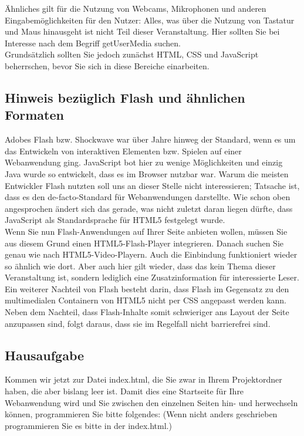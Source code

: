 Ähnliches gilt für die Nutzung von Webcams, Mikrophonen und anderen Eingabemöglichkeiten für den Nutzer: Alles, was über die Nutzung von Tastatur und Maus hinausgeht ist nicht Teil dieser Veranstaltung. Hier sollten Sie bei Interesse nach dem Begriff getUserMedia suchen.\\

Grundsätzlich sollten Sie jedoch zunächst HTML, CSS und JavaScript beherrschen, bevor Sie sich in diese Bereiche einarbeiten.

\subsection{Hinweis bezüglich Flash und ähnlichen Formaten}

Adobes Flash bzw. Shockwave war über Jahre hinweg der Standard, wenn es um das Entwickeln von interaktiven Elementen bzw. Spielen auf einer Webanwendung ging. JavaScript bot hier zu wenige Möglichkeiten und einzig Java wurde so entwickelt, dass es im Browser nutzbar war. Warum die meisten Entwickler Flash nutzten soll uns an dieser Stelle nicht interessieren; Tatsache ist, dass es den de-facto-Standard für Webanwendungen darstellte. Wie schon oben angesprochen ändert sich das gerade, was nicht zuletzt daran liegen dürfte, dass JavaScript als Standardsprache für HTML5 festgelegt wurde. \\

Wenn Sie nun Flash-Anwendungen auf Ihrer Seite anbieten wollen, müssen Sie aus diesem Grund einen HTML5-Flash-Player integrieren. Danach suchen Sie genau wie nach HTML5-Video-Playern. Auch die Einbindung funktioniert wieder so ähnlich wie dort. Aber auch hier gilt wieder, dass das kein Thema dieser Veranstaltung ist, sondern lediglich eine Zusatzinformation für interessierte Leser.\\

Ein weiterer Nachteil von Flash besteht darin, dass Flash im Gegensatz zu den multimedialen Containern von HTML5 nicht per CSS angepasst werden kann. Neben dem Nachteil, dass Flash-Inhalte somit schwieriger ans Layout der Seite anzupassen sind, folgt daraus, dass sie im Regelfall nicht barrierefrei sind.

\subsection{Hausaufgabe}

Kommen wir jetzt zur Datei index.html, die Sie zwar in Ihrem Projektordner haben, die aber bislang leer ist. Damit dies eine Startseite für Ihre Webanwendung wird und Sie zwischen den einzelnen Seiten hin- und herwechseln können, programmieren Sie bitte folgendes: (Wenn nicht anders geschrieben programmieren Sie es bitte in der index.html.)\\

